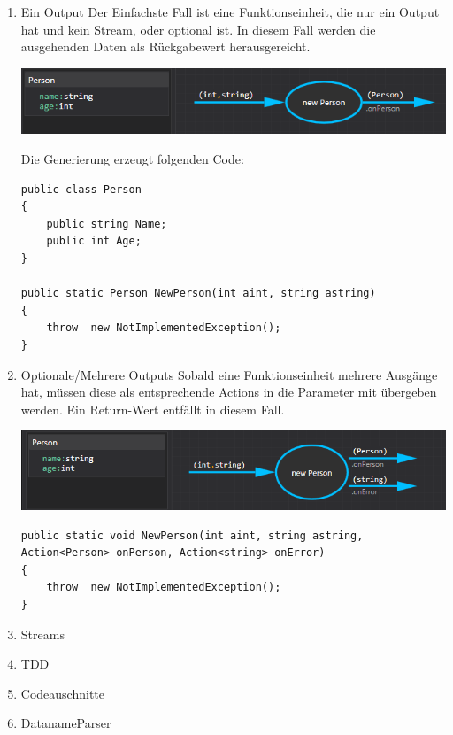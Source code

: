 \documentclass[11pt]{article}
\begin{document}
\begin{enumerate}
\item Ein Output
\label{sec:orgheadline34}
Der Einfachste Fall ist eine Funktionseinheit, die nur ein Output hat und
kein Stream, oder optional ist.
In diesem Fall werden die ausgehenden Daten als Rückgabewert herausgereicht.

\includegraphics[width=.9\linewidth]{./img/roslyn_simpleOutput.png} 

Die Generierung erzeugt folgenden Code:
\begin{verbatim}
public class Person
{
    public string Name;
    public int Age;
}

public static Person NewPerson(int aint, string astring)
{
    throw  new NotImplementedException();
}
\end{verbatim}

\item Optionale/Mehrere Outputs
\label{sec:orgheadline35}
Sobald eine Funktionseinheit mehrere Ausgänge hat, müssen diese als entsprechende Actions in die Parameter mit
übergeben werden. Ein Return-Wert entfällt in diesem Fall.

\includegraphics[width=.9\linewidth]{./img/roslyn_multipleOutputs.png} 

\begin{verbatim}
public static void NewPerson(int aint, string astring, Action<Person> onPerson, Action<string> onError)
{
    throw  new NotImplementedException();
}
\end{verbatim}

\item Streams
\label{sec:orgheadline36}

\item TDD
\label{sec:orgheadline37}

\item Codeauschnitte
\label{sec:orgheadline38}

\item DatanameParser
\label{sec:orgheadline39}
\end{enumerate}
\end{document}
